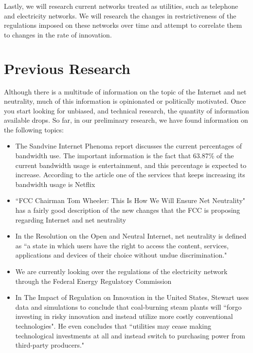 \documentclass{sigcomm-alternate}
\begin{document}
Lastly, we will research current networks treated as utilities, such as telephone and electricity networks. We will research the changes in restrictiveness of the regulations imposed on these networks over time and attempt to correlate them to changes in the rate of innovation.


\section{Previous Research}
Although there is a multitude of information on the topic of the Internet and net neutrality, much of this information is opinionated or politically motivated. Once you start looking for unbiased, and technical research, the quantity of information available drops. So far, in our preliminary research, we have found information on the following topics: 

\begin{itemize}
	\item The Sandvine Internet Phenoma report discusses the current percentages of bandwidth use. The important information is the fact that 63.87\% of the current bandwidth usage is entertainment, and this percentage is expected to increase. According to the article one of the services that keeps increasing its bandwidth usage is Netflix\cite{Sandvine}

	\item ``FCC Chairman Tom Wheeler: This Is How We Will Ensure Net Neutrality" has a fairly good description of the new changes that the FCC is proposing regarding Internet and net neutrality\cite{FCCTomWheeler}
	
	\item In the Resolution on the Open and Neutral Internet, net neutrality is defined as ``a state in which users have the right to access the content, services, applications and devices of their choice without undue discrimination."\cite{ResolutionOnOpenInternet}
	
	\item We are currently looking over the regulations of the electricity network through the Federal Energy Regulatory Commission \cite{FERC}
	
	
	\item In The Impact of Regulation on Innovation in the United States, Stewart uses data and simulations to conclude that coal-burning steam plants will ``forgo investing in risky innovation and instead utilize more costly conventional technologies"\cite{RegulationOnInnovation}. He even concludes that ``utilities may cease making technological investments at all and instead switch to purchasing power from third-party producers."\cite{RegulationOnInnovation}
\end{itemize}
\end{document}
